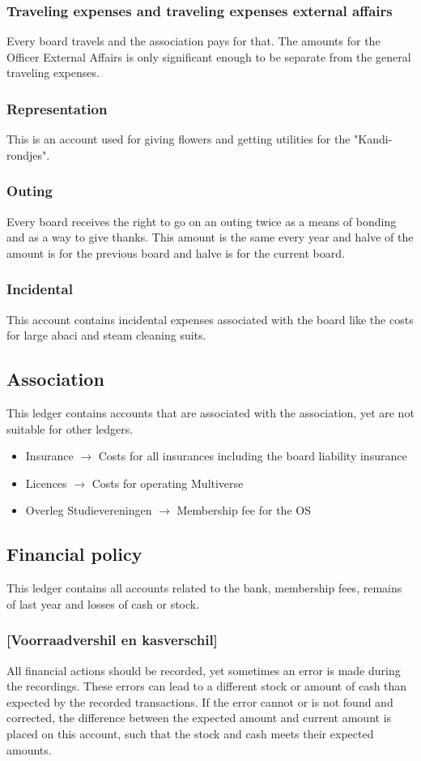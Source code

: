 \documentclass{report}
\begin{document}
\subsubsection{Traveling expenses and traveling expenses external affairs}
Every board travels and the association pays for that. The amounts for the Officer External Affairs is only significant enough to be separate from the general traveling expenses. 
\subsubsection{Representation}
This is an account used for giving flowers and getting utilities for the "Kandi-rondjes".
\subsubsection{Outing}
Every board receives the right to go on an outing twice as a means of bonding and as a way to give thanks. This amount is the same every year and halve of the amount is for the previous board and halve is for the current board. 
\subsubsection{Incidental}
This account contains incidental expenses associated with the board like the costs for large abaci and steam cleaning suits. 
\subsection{Association}
This ledger contains accounts that are associated with the association, yet are not suitable for other ledgers. 
\begin{itemize}
	\item Insurance $\rightarrow$ Costs for all insurances including the board liability insurance
	\item Licences $\rightarrow$ Costs for operating Multiverse
	\item Overleg Studievereningen $\rightarrow$ Membership fee for the OS
\end{itemize}
\subsection{Financial policy}
This ledger contains all accounts related to the bank, membership fees, remains of last year and losses of cash or stock.
\subsubsection{[Voorraadvershil en kasverschil]}
All financial actions should be recorded, yet sometimes an error is made during the recordings. These errors can lead to a different stock or amount of cash than expected by the recorded transactions. If the error cannot or is not found and corrected, the difference between the expected amount and current amount is placed on this account, such that the stock and cash meets their expected amounts. 
\end{document}
